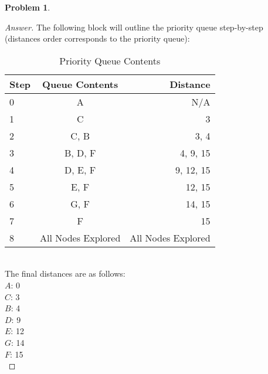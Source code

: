 \documentclass[11pt]{article}
\theoremstyle{definition}
\theoremstyle{definition}
\newtheorem{required}{Problem}
\theoremstyle{definition}
\begin{document}
\begin{required}


\begin{proof}[Answer] 
	\indent The following block will outline the priority queue step-by-step (distances order corresponds to the priority queue):\\
\begin{table}[h!]
	\begin{center}
		\caption{Priority Queue Contents}
		\label{tab:table1}
		\begin{tabular}{l|c|r} %
			\textbf{Step} & \textbf{Queue Contents} & \textbf{Distance}\\
			\hline
			0 & A & N/A\\
			1 & C & 3\\
			2 & C, B & 3, 4\\
			3 & B, D, F & 4, 9, 15\\
			4 & D, E, F & 9, 12, 15\\
			5 & E, F & 12, 15\\
			6 & G, F  & 14, 15\\
			7 & F & 15\\
			8 & All Nodes Explored & All Nodes Explored\\
		\end{tabular}
	\end{center}
\end{table}\\
The final distances are as follows:\\
$A$: 0\\
$C$: 3\\
$B$: 4\\
$D$: 9\\
$E$: 12\\
$G$: 14\\
$F$: 15\\

\end{proof}





\end{required}
\end{document}
